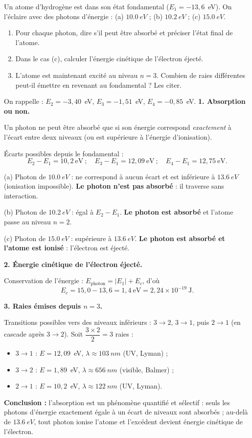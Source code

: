 \documentclass[11pt]{article}
\begin{document}
\begin{exoresolu}
Un atome d'hydrogène est dans son état fondamental ($E_1 = -13{,}6$~eV). On l'éclaire avec des photons d'énergie : (a) $\SI{10,0}{eV}$ ; (b) $\SI{10,2}{eV}$ ; (c) $\SI{15,0}{eV}$.
\begin{enumerate}
\item Pour chaque photon, dire s'il peut être absorbé et préciser l'état final de l'atome.
\item Dans le cas (c), calculer l'énergie cinétique de l'électron éjecté.
\item L'atome est maintenant excité au niveau $n=3$. Combien de raies différentes peut-il émettre en revenant au fondamental ? Les citer.
\end{enumerate}
On rappelle : $E_2 = -3{,}40$~eV, $E_3 = -1{,}51$~eV, $E_4 = -0{,}85$~eV.
\tcblower
\textbf{1. Absorption ou non.}

Un photon ne peut être absorbé que si son énergie correspond \emph{exactement} à l'écart entre deux niveaux (ou est supérieure à l'énergie d'ionisation).

Écarts possibles depuis le fondamental :
\[
E_2 - E_1 = 10{,}2~\text{eV} \ ; \quad E_3 - E_1 = 12{,}09~\text{eV} \ ; \quad E_4 - E_1 = 12{,}75~\text{eV}.
\]

(a) Photon de $\SI{10,0}{eV}$ : ne correspond à aucun écart et est inférieure à $\SI{13,6}{eV}$ (ionisation impossible). \textbf{Le photon n'est pas absorbé} : il traverse sans interaction.

(b) Photon de $\SI{10,2}{eV}$ : égal à $E_2 - E_1$. \textbf{Le photon est absorbé} et l'atome passe au niveau $n=2$.

(c) Photon de $\SI{15,0}{eV}$ : supérieure à $\SI{13,6}{eV}$. \textbf{Le photon est absorbé et l'atome est ionisé} : l'électron est éjecté.

\textbf{2. Énergie cinétique de l'électron éjecté.}

Conservation de l'énergie : $E_{\text{photon}} = |E_1| + E_c$, d'où
\[
E_c = 15{,}0 - 13{,}6 = 1{,}4~\text{eV} = 2{,}24\times 10^{-19}~\text{J}.
\]

\textbf{3. Raies émises depuis $n=3$.}

Transitions possibles vers des niveaux inférieurs : $3 \to 2$, $3 \to 1$, puis $2 \to 1$ (en cascade après $3 \to 2$). Soit $\dfrac{3\times 2}{2} = 3$ raies :
\begin{itemize}
\item $3 \to 1$ : $E = 12{,}09$~eV, $\lambda \approx \SI{103}{nm}$ (UV, Lyman) ;
\item $3 \to 2$ : $E = 1{,}89$~eV, $\lambda \approx \SI{656}{nm}$ (visible, Balmer) ;
\item $2 \to 1$ : $E = 10{,}2$~eV, $\lambda \approx \SI{122}{nm}$ (UV, Lyman).
\end{itemize}

\textbf{Conclusion :} l'absorption est un phénomène quantifié et sélectif : seuls les photons d'énergie exactement égale à un écart de niveaux sont absorbés ; au-delà de $\SI{13,6}{eV}$, tout photon ionise l'atome et l'excédent devient énergie cinétique de l'électron.
\end{exoresolu}
\end{document}
